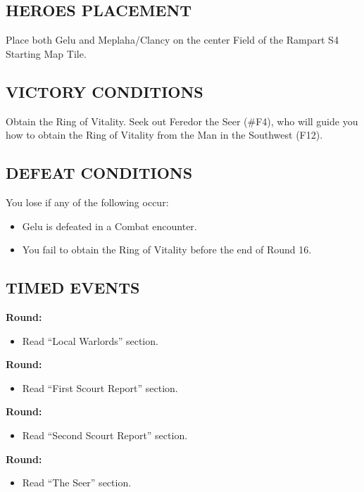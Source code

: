 \begin{multicols*}{2}
\subsection*{\MakeUppercase{Heroes Placement}}

Place both Gelu and Meplaha/Clancy on the center Field of the Rampart S4 Starting Map Tile.

\subsection*{\MakeUppercase{Victory Conditions}}

Obtain the Ring of Vitality.
Seek out Feredor the Seer (\#F4), who will guide you how to obtain the Ring of Vitality from the Man in the Southwest (F12).

\subsection*{\MakeUppercase{Defeat Conditions}}

You lose if any of the following occur:
\begin{itemize}
  \item Gelu is defeated in a Combat encounter.
  \item You fail to obtain the Ring of Vitality before the end of Round 16.
\end{itemize}

\subsection*{\MakeUppercase{Timed Events}}

\textbf{ Round:}
\begin{itemize}
  \item Read ``Local Warlords'' section.
  \end{itemize}

\textbf{ Round:}
\begin{itemize}
  \item Read ``First Scourt Report'' section.
\end{itemize}

\textbf{ Round:}
\begin{itemize}
  \item Read ``Second Scourt Report'' section.
\end{itemize}

\textbf{ Round:}
\begin{itemize}
  \item Read ``The Seer'' section.
\end{itemize}


\end{multicols*}
